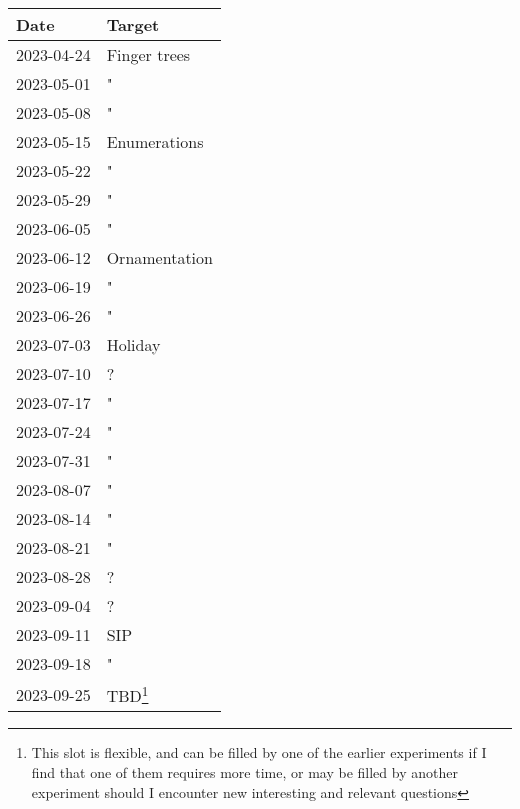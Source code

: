 \documentclass{article}
\theoremstyle{plain}%
\theoremstyle{definition}
\begin{document}
\begin{longtable}{l l}
Date & Target \\
\hline
2023-04-24 & Finger trees               \\
2023-05-01 & "              \\
2023-05-08 & "         \\
2023-05-15 & Enumerations                                        \\
2023-05-22 & "        \\
2023-05-29 & "                                                                  \\
2023-06-05 & "  \\
2023-06-12 & Ornamentation                                                                  \\
2023-06-19 & "                                           \\
2023-06-26 & "                                   \\
2023-07-03 & Holiday                                                            \\
2023-07-10 & ?                                                                  \\
2023-07-17 & "                                                                  \\
2023-07-24 & "                                                                  \\
2023-07-31 & "                                                                  \\
2023-08-07 & "                                                                  \\
2023-08-14 & "                                                                  \\
2023-08-21 & "                                                                  \\
2023-08-28 & ?                                                                  \\
2023-09-04 & ?                                                                  \\
2023-09-11 & SIP                                    \\
2023-09-18 & "                                                                  \\
2023-09-25 & TBD\footnote{This slot is flexible, and can be filled by one of the earlier experiments if I find that one of them requires more time, or may be filled by another experiment should I encounter new interesting and relevant questions}                                \\

\end{longtable}
\end{document}
